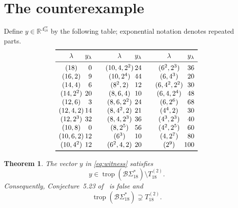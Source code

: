 \documentclass[11pt]{amsart}
\newtheorem{theorem}{Theorem}
\DeclareMathOperator{\trop}{trop}
\newcommand{\BS}{\mathcal{B}\Sigma}
\newcommand{\EPart}{\Lambda^{\mathrm{ev}}}
\newcommand{\R}{\mathbb{R}}
\begin{document}
\section{The counterexample}

Define \(y\in\R^{\EPart_{18}}\) by the following table; exponential
notation denotes repeated parts.
{\small
\begin{equation}\label{eq:witness}
\renewcommand{\arraystretch}{1.04}
\begin{array}{
  c@{\,}r@{\qquad}
  c@{\,}r@{\qquad}
  c@{\,}r
}
\toprule
\lambda & y_\lambda &
\lambda & y_\lambda &
\lambda & y_\lambda \\
\midrule
(18)       & 0  & (10,4,2^2) & 24 & (6^2,2^3)   & 36  \\
(16,2)     & 9  & (10,2^4)   & 44 & (6,4^3)     & 20  \\
(14,4)     & 6  & (8^2,2)    & 12 & (6,4^2,2^2) & 30  \\
(14,2^2)   & 20 & (8,6,4)    & 10 & (6,4,2^4)   & 48  \\
(12,6)     & 3  & (8,6,2^2)  & 24 & (6,2^6)     & 68  \\
(12,4,2)   & 14 & (8,4^2,2)  & 21 & (4^4,2)     & 30  \\
(12,2^3)   & 32 & (8,4,2^3)  & 36 & (4^3,2^3)   & 40  \\
(10,8)     & 0  & (8,2^5)    & 56 & (4^2,2^5)   & 60  \\
(10,6,2)   & 12 & (6^3)      & 10 & (4,2^7)     & 80  \\
(10,4^2)   & 12 & (6^2,4,2)  & 20 & (2^9)       & 100 \\
\bottomrule
\end{array}
\end{equation}
}

\begin{theorem}\label{thm:main}
The vector \(y\) in \eqref{eq:witness} satisfies
\[
y\in\trop(\BS_{18}^{*})\setminus T_{18}^{(2)}.
\]
Consequently, Conjecture~5.23 of~\cite{ABDR} is false and
\[
\trop(\BS_{18}^{*})\supsetneq T_{18}^{(2)}.
\]
\end{theorem}
\end{document}
